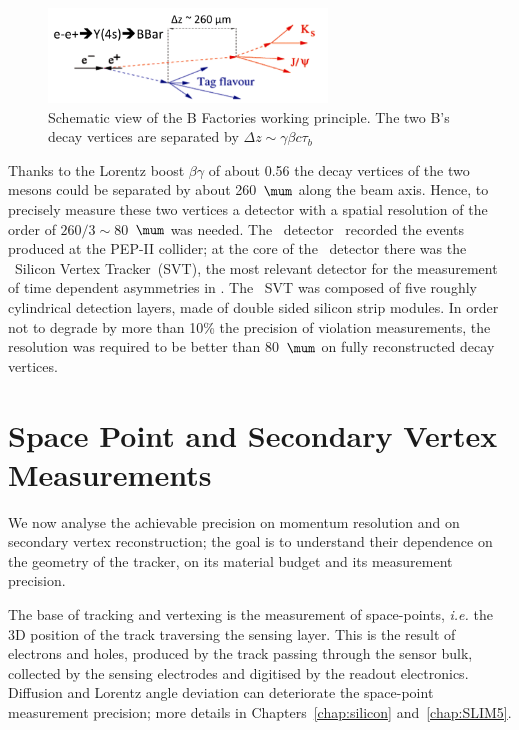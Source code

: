 \begin{figure}[htbp]
   \centering
   \includegraphics[width=0.66\textwidth]{BFCPV.png} %
   \caption{Schematic view of the B Factories working principle. The two B's decay vertices are separated 
   by $\Delta z \sim \gamma \beta c \tau_{b}$}
   \label{fig:BFCPV}
\end{figure}

Thanks to the Lorentz boost $\beta\gamma$ of about 0.56 the decay vertices of the two \B mesons 
could be separated by about 260~$\mum$ along the beam axis. Hence, to precisely measure these 
two vertices a detector with a spatial resolution of the order of $260/3\sim80$~$\mum$ was needed.
The \babar~detector~\cite{AUBERT20021} recorded the events produced at the PEP-II collider; 
at the core of the \babar~detector there was the \babar~Silicon Vertex Tracker~(SVT),  the most relevant detector for the measurement of time dependent \CP asymmetries in \babar. The \babar~SVT 
was composed of five roughly cylindrical detection layers, made of double sided silicon strip modules. 
In order not to degrade by more than 10\% the precision of  \CP violation measurements, the resolution 
was required to be better than 80~$\mum$ on fully reconstructed \B decay vertices.

\section{Space Point and Secondary Vertex Measurements}
\label{sec:SPmeas}

We now analyse the achievable precision on momentum resolution and on secondary vertex 
reconstruction; the goal is to understand their dependence on the geometry of the tracker, on its 
material budget and its measurement precision. 

The base of tracking and vertexing is the measurement of space-points, {\it i.e.} the 3D position 
of the track traversing the sensing layer. This is the result of electrons and holes, produced by the 
track passing through the sensor bulk, collected by the sensing electrodes and digitised by the 
readout electronics. Diffusion and Lorentz angle deviation 
can deteriorate the space-point measurement precision; more details in Chapters~\ref{chap:silicon}
 and~\ref{chap:SLIM5}.

